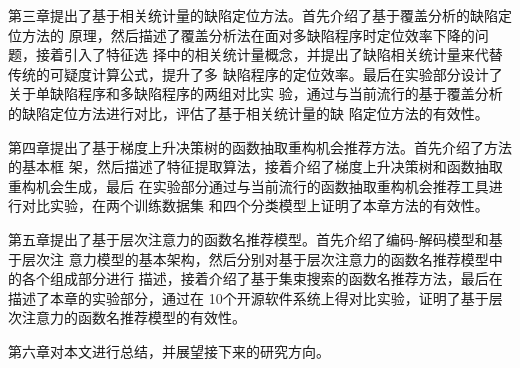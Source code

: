 第三章提出了基于相关统计量的缺陷定位方法。首先介绍了基于覆盖分析的缺陷定位方法的
原理，然后描述了覆盖分析法在面对多缺陷程序时定位效率下降的问题，接着引入了特征选
择中的相关统计量概念，并提出了缺陷相关统计量来代替传统的可疑度计算公式，提升了多
缺陷程序的定位效率。最后在实验部分设计了关于单缺陷程序和多缺陷程序的两组对比实
验，通过与当前流行的基于覆盖分析的缺陷定位方法进行对比，评估了基于相关统计量的缺
陷定位方法的有效性。

第四章提出了基于梯度上升决策树的函数抽取重构机会推荐方法。首先介绍了方法的基本框
架，然后描述了特征提取算法，接着介绍了梯度上升决策树和函数抽取重构机会生成，最后
在实验部分通过与当前流行的函数抽取重构机会推荐工具进行对比实验，在两个训练数据集
和四个分类模型上证明了本章方法的有效性。

第五章提出了基于层次注意力的函数名推荐模型。首先介绍了编码-解码模型和基于层次注
意力模型的基本架构，然后分别对基于层次注意力的函数名推荐模型中的各个组成部分进行
描述，接着介绍了基于集束搜索的函数名推荐方法，最后在描述了本章的实验部分，通过在
10个开源软件系统上得对比实验，证明了基于层次注意力的函数名推荐模型的有效性。

第六章对本文进行总结，并展望接下来的研究方向。
